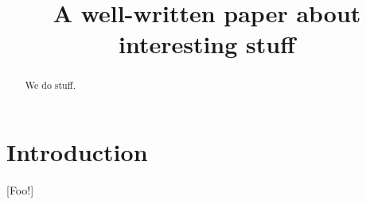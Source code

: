 \documentclass[a4paper]{llncs}
\title{A well-written paper about interesting stuff}
\def\buildexternal{1}
\newcommand{\tikzexternalizemaybe}{%
  \ifthenelse{\equal{\buildexternal}{1}}%
  {\tikzset{external/export=true}}%
  {\tikzset{external/export=false}%
}}%
\begin{document}
\maketitle

\begin{abstract}
  We do stuff.
\end{abstract}

\section{Introduction}\label{sec:introduction}

[Foo!]





\clearpage


\end{document}
